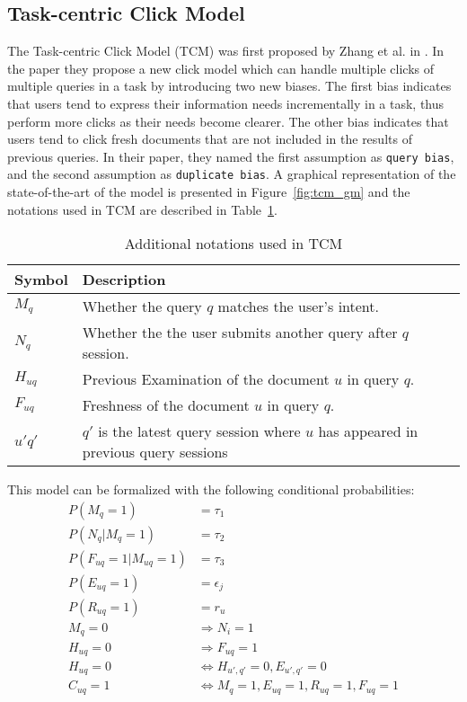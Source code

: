 \subsection{Task-centric Click Model}
\label{sec:methodology_tcm}
The Task-centric Click Model (TCM) was first proposed by Zhang et al. in \cite{Zhang2011}. In the paper they propose a new click model which can handle multiple clicks of multiple queries in a task by introducing two new biases. The first bias indicates that users tend to express their information needs incrementally in a task, thus perform more clicks as their needs become clearer. The other bias indicates that users tend to click fresh documents that are not included in the results of previous queries. In their paper, they named the first assumption as \texttt{query bias}, and the second assumption as \texttt{duplicate bias}. A graphical representation of the state-of-the-art of the model is presented in Figure~\ref{fig:tcm_gm} and the notations used in TCM are described in Table~\ref{table:tcm_notations}. 

\begin{table}[ht]
	\centering
	\begin{tabular}{l|lll|}
		\hline
		Symbol & Description \\
		\hline
		$M_q$			& Whether the query $q$ matches the user's intent.\\
		$N_q$ 			& Whether the the user submits another query after $q$ session.\\		
		$H_{uq}$ 		& Previous Examination of the document $u$ in query $q$.\\
		$F_{uq}$ 		& Freshness of the document $u$ in query $q$.\\
		$u'q'$ & $q'$ is the latest query session where \(u\) has appeared in previous query sessions \\
		\hline
	\end{tabular}
	\caption{Additional notations used in TCM}
	\label{table:tcm_notations}
\end{table}

This model can be formalized with the following conditional probabilities:
\begin{align}
	P(M_q=1) &= \tau_1 \\
	\label{eq:alpha_2}
	P(N_q|M_q=1) &= \tau_2 \\
	P(F_{uq}=1|M_{uq}=1) &= \tau_3 \\
	P(E_{uq}=1) &= \epsilon_j \\
	P(R_{uq}=1) &= r_u \\
	M_q = 0 &\Rightarrow N_i = 1\\
	H_{uq} = 0 &\Rightarrow F_{uq} = 1\\
	H_{uq} = 0 &\Leftrightarrow H_{u',q'} = 0, E_{u',q'} = 0\\
	C_{uq} = 1 &\Leftrightarrow M_q = 1, E_{uq} = 1, R_{uq} = 1, F_{uq} = 1
\end{align}

